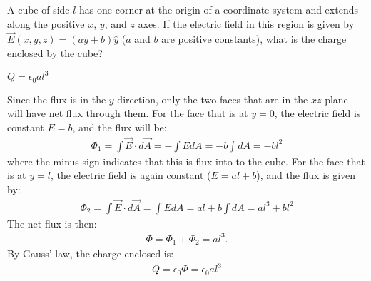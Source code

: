 

\question A cube of side $l$ has one corner at the origin of a coordinate system and extends along the positive $x$, $y$, and $z$ axes. If the electric field in this region is given by $\vec E(x,y,z)=(ay+b)\hat y$ ($a$ and $b$ are positive constants), what is the charge enclosed by the cube?
\begin{finalanswer}
$Q=\epsilon_0al^3$
\end{finalanswer}
\begin{solution}
Since the flux is in the $y$ direction, only the two faces that are in the $xz$ plane will have net flux through them. For the face that is at $y=0$, the electric field is constant $E=b$, and the flux will be:
\begin{align*}
\Phi_1=\int \vec E\cdot d\vec A=-\int EdA=-b\int dA=-bl^2
\end{align*}
where the minus sign indicates that this is flux into to the cube. For the face that is at $y=l$, the electric field is again constant ($E=al+b$), and the flux is given by:
\begin{align*}
\Phi_2=\int \vec E\cdot d\vec A=\int EdA=al+b\int dA=al^3+bl^2
\end{align*}
The net flux is then:
\begin{align*}
\Phi=\Phi_1+\Phi_2=al^3.
\end{align*}
By Gauss' law, the charge enclosed is:
\begin{align*}
Q=\epsilon_0\Phi=\epsilon_0al^3
\end{align*}

\end{solution}

